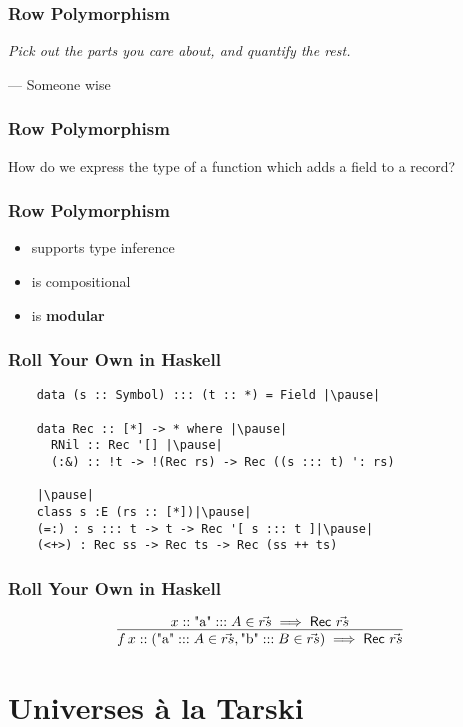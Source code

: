 \documentclass[12pt]{beamer}
\begin{document}
\begin{frame}
  \frametitle{Row Polymorphism}
  \pause
  \emph{Pick out the parts you care about, and quantify the rest.}

  \centerline{--- Someone wise}
\end{frame}

\begin{frame}
  \frametitle{Row Polymorphism}
  How do we express the type of a function which adds a field to a record?\pause
\end{frame}

\begin{frame}
  \frametitle{Row Polymorphism}\pause
  \begin{itemize}
    \item supports type inference\pause
    \item is compositional\pause
    \item is \textbf{modular}\pause
  \end{itemize}
\end{frame}

\begin{frame}[fragile]
  \frametitle{Roll Your Own in Haskell}\pause
  \begin{lstlisting}
    data (s :: Symbol) ::: (t :: *) = Field |\pause|

    data Rec :: [*] -> * where |\pause|
      RNil :: Rec '[] |\pause|
      (:&) :: !t -> !(Rec rs) -> Rec ((s ::: t) ': rs)

    |\pause|
    class s :E (rs :: [*])|\pause|
    (=:) : s ::: t -> t -> Rec '[ s ::: t ]|\pause|
    (<+>) : Rec ss -> Rec ts -> Rec (ss ++ ts)
  \end{lstlisting}
\end{frame}
\begin{frame}
  \frametitle{Roll Your Own in Haskell}\pause
  \[
    \infer{
      f\, x :: (\text{"a"} ::: A\in\vec{rs}, \text{"b"} ::: B\in\vec{rs}) \implies \mathsf{Rec}\ \vec{rs}
    }{
      x :: \text{"a"} ::: A\in\vec{rs}\implies \mathsf{Rec}\ \vec{rs}
    }
  \]
\end{frame}

\section{Universes \`a la Tarski}
\end{document}

